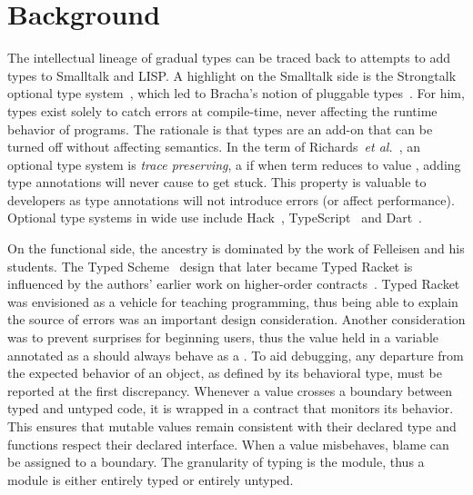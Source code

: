 \documentclass[a4paper,USenglish]{tex/lipics-v2016}
\begin{document}
\section{Background}


\noindent The intellectual lineage of gradual types can be traced back to
attempts to add types to Smalltalk and LISP. A highlight on the Smalltalk
side is the Strongtalk optional type system~\cite{Bracha93}, which led to
Bracha's notion of pluggable types~\cite{pluggabletypes}. For him, types
exist solely to catch errors at compile-time, never affecting the runtime
behavior of programs. The rationale is that types are an add-on that can be
turned off without affecting semantics.  In the term of Richards~\emph{et
  al.}~\cite{ecoop15}, an optional type system is \emph{trace preserving}, a
if when term \e reduces to value \a, adding type annotations will never
cause \e to get stuck. This property is valuable to developers as type
annotations will not introduce errors (or affect performance).  Optional
type systems in wide use include Hack~\cite{hack13}, TypeScript~\cite{BAT14}
and Dart~\cite{dart13}.

On the functional side, the ancestry is dominated by the work of Felleisen
and his students.  The Typed Scheme~\cite{tf-popl08} design that later
became Typed Racket is influenced by the authors' earlier work on
higher-order contracts~\cite{ff-icfp02}. Typed Racket was envisioned as a
vehicle for teaching programming, thus being able to explain the source of
errors was an important design consideration. Another consideration was to
prevent surprises for beginning users, thus the value held in a variable
annotated as a \C should always behave as a \C. To aid debugging, any
departure from the expected behavior of an object, as defined by its
behavioral type, must be reported at the first discrepancy.  Whenever a value
crosses a boundary between typed and untyped code, it is wrapped in a
contract that monitors its behavior. This ensures that mutable values
remain consistent with their declared type and functions respect their
declared interface. When a value misbehaves, blame can be assigned to a
boundary. The granularity of typing is the module, thus a module is either
entirely typed or entirely untyped. 
\end{document}
